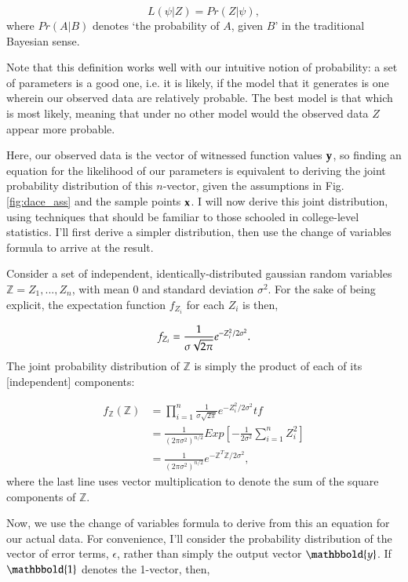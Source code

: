 \begin{equation} \label{eq:def_likelihood}
L(\psi|Z) = Pr(Z|\psi),
\end{equation}
where $Pr(A|B)$ denotes `the probability of $A$, given $B$' in the traditional Bayesian sense.

Note that this definition works well with our intuitive notion of probability: a set of parameters is a good one, i.e. it is likely, if the model that it generates is one wherein our observed data are relatively probable. The best model is that which is most likely, meaning that under no other model would the observed data $Z$ appear more probable.

Here, our observed data is the vector of witnessed function values $\mathbf{y}$, so finding an equation for the likelihood of our parameters is equivalent to deriving the joint probability distribution of this $n$-vector, given the assumptions in Fig. \ref{fig:dace_ass} and the sample points $\mathbf{x}$. I will now derive this joint distribution, using techniques that should be familiar to those schooled in college-level statistics. I'll first derive a simpler distribution, then use the change of variables formula to arrive at the result.

Consider a set of independent, identically-distributed gaussian random variables $\mathbb{Z} = Z_1,...,Z_n$, with mean 0 and standard deviation $\sigma^2$. For the sake of being explicit, the expectation function $f_{Z_i}$ for each $Z_i$ is then,

\begin{equation} \label{eq:f_{Z_i}}
f_{Z_i}=\frac{1}{\sigma\sqrt{2\pi}}e^{-Z_i^2/2\sigma^2}.
\end{equation}
The joint probability distribution of $\mathbb{Z}$ is simply the product of each of its [independent] components:

\begin{align}  \label{eq:F_Z}
f_\mathbb{Z}(\mathbb{Z}) &= \prod_{i=1}^n \frac{1}{\sigma\sqrt{2\pi}}e^{-Z_i^2/2\sigma^2}tf  \\
			 &= \frac{1}{(2\pi\sigma^2)^{n/2}} {E}xp\left [ -\frac{1}{2\sigma^2}\sum_{i=1}^{n} Z_i^2\right ] \nonumber\\
			 &= \frac{1}{(2\pi\sigma^2)^{n/2}} e^{-\mathbb{Z}^T\mathbb{Z}/2\sigma^2},\nonumber
\end{align}
where the last line uses vector multiplication to denote the sum of the square components of $\mathbb{Z}$.

Now, we use the change of variables formula to derive from this an equation for our actual data. For convenience, I'll consider the probability distribution of the vector of error terms, $\mathbb{\epsilon}$, rather than simply the output vector $\mathbbold{y}$. If $\mathbbold{1}$ denotes the 1-vector, then,

